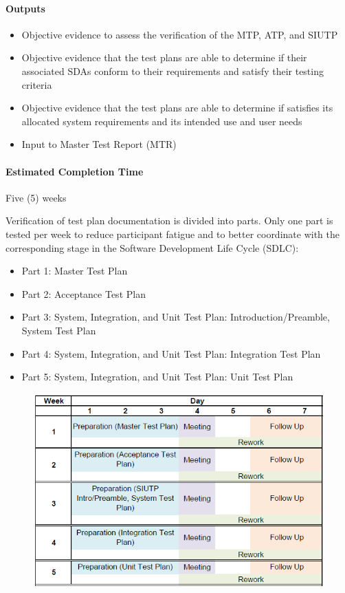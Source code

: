 \paragraph{Outputs}
\begin{itemize}

    \item Objective evidence to assess the verification of the MTP, ATP, and
    SIUTP

    \item Objective evidence that the test plans are able to determine if their
    associated SDAs conform to their requirements and satisfy their testing
    criteria

    \item Objective evidence that the test plans are able to determine if
    \progname{} satisfies its allocated system requirements and its intended
    use and user needs

    \item Input to Master Test Report (MTR)

\end{itemize}

\paragraph{Estimated Completion Time} Five (5) weeks

Verification of test plan documentation is divided into parts. Only one part is
tested per week to reduce participant fatigue and to better coordinate with the
corresponding stage in the Software Development Life Cycle (SDLC):
\begin{itemize}

    \item Part 1: Master Test Plan

    \item Part 2: Acceptance Test Plan

    \item Part 3: System, Integration, and Unit Test Plan:
    Introduction/Preamble, System Test Plan

    \item Part 4: System, Integration, and Unit Test Plan: Integration Test Plan

    \item Part 5: System, Integration, and Unit Test Plan: Unit Test Plan

\end{itemize}

\begin{figure}[!h]
    \centering
    \includegraphics[width=0.8\linewidth]{figures/TP_Schedule.png}
\end{figure}